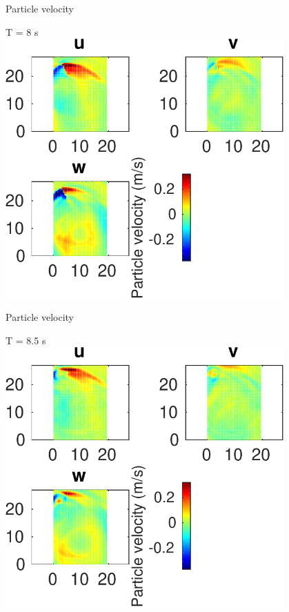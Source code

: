 \documentclass{beamer}
\begin{document}
\begin{frame}
 {Particle velocity}
 
 \centering \Large T = 8 s\\
 \includegraphics[width=0.8\textwidth]{images/horizontal_velo_00086}
 
\end{frame}

\begin{frame}
 {Particle velocity}
 
 \centering \Large T = 8.5 s\\
 \includegraphics[width=0.8\textwidth]{images/horizontal_velo_00091}
 
\end{frame}
\end{document}
